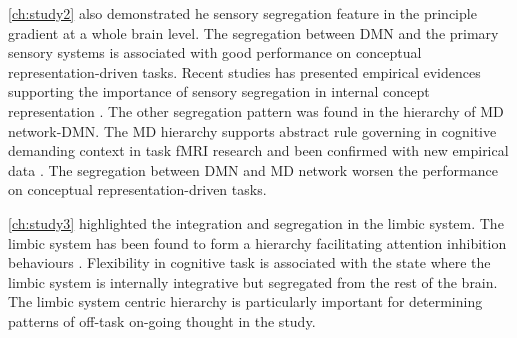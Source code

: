 \cref{ch:study2} also demonstrated he sensory segregation feature in the principle gradient at a whole brain level. The segregation between DMN and the primary sensory systems is associated with good performance on conceptual representation-driven tasks. Recent studies has presented empirical evidences supporting the importance of sensory segregation in internal concept representation \cite{Murphy2018,Villena-Gonzalez2018}. The other segregation pattern was found in the hierarchy of MD network-DMN. The MD hierarchy supports abstract rule governing in cognitive demanding context in task fMRI research \cite{Duncan2010} and been confirmed with new empirical data \cite{Crittenden2016}. The segregation between DMN and MD network worsen the performance on conceptual representation-driven tasks.  

\cref{ch:study3} highlighted the integration and segregation in the limbic system. The limbic system has been found to form a hierarchy facilitating attention inhibition behaviours \cite{Kleckner2017}.  Flexibility in cognitive task is associated with the state where the limbic system is internally integrative but segregated from the rest of the brain. The limbic system centric hierarchy is particularly important for determining patterns of off-task on-going thought in the study. 




